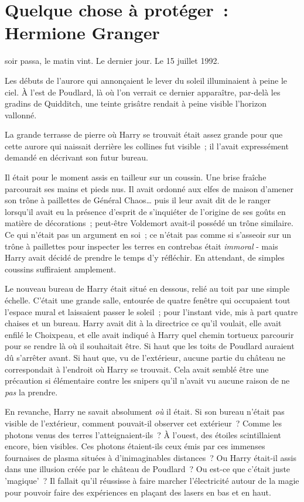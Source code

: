 \chapter{Quelque chose à protéger~: Hermione Granger}

 soir passa, le matin vint. Le dernier jour. Le 15 juillet 1992.

\hplettrineextrapara
Les débuts de l'aurore qui annonçaient le lever du soleil illuminaient à peine le ciel. À l'est de Poudlard, là où l'on verrait ce dernier apparaître, par-delà les gradins de Quidditch, une teinte grisâtre rendait à peine visible l'horizon vallonné.

La grande terrasse de pierre où Harry se trouvait était assez grande pour que cette aurore qui naissait derrière les collines fut visible~; il l'avait expressément demandé en décrivant son futur bureau.

Il était pour le moment assis en tailleur sur un coussin. Une brise fraîche parcourait ses mains et pieds nus. Il avait ordonné aux elfes de maison d'amener son trône à paillettes de Général Chaos… puis il leur avait dit de le ranger lorsqu'il avait eu la présence d'esprit de s'inquiéter de l'origine de ses goûts en matière de décorations~; peut-être Voldemort avait-il possédé un trône similaire. Ce qui n'était pas un argument en soi~; ce n'était pas comme si s'asseoir sur un trône à paillettes pour inspecter les terres en contrebas était \emph{immoral} - mais Harry avait décidé de prendre le temps d'y réfléchir. En attendant, de simples coussins suffiraient amplement.

Le nouveau bureau de Harry était situé en dessous, relié au toit par une simple échelle. C'était une grande salle, entourée de quatre fenêtre qui occupaient tout l'espace mural et laissaient passer le soleil~; pour l'instant vide, mis à part quatre chaises et un bureau. Harry avait dit à la directrice ce qu'il voulait, elle avait enfilé le Choixpeau, et elle avait indiqué à Harry quel chemin tortueux parcourir pour se rendre là où il souhaitait être. Si haut que les toits de Poudlard auraient dû s'arrêter avant. Si haut que, vu de l'extérieur, aucune partie du château ne correspondait à l'endroit où Harry se trouvait. Cela avait semblé être une précaution si élémentaire contre les snipers qu'il n'avait vu aucune raison de ne \emph{pas} la prendre.

En revanche, Harry ne savait absolument \emph{où} il était. Si son bureau n'était pas visible de l'extérieur, comment pouvait-il observer cet extérieur~? Comme les photons venus des terres l'atteignaient-ils~? À l'ouest, des étoiles scintillaient encore, bien visibles. Ces photons étaient-ils ceux émis par ces immenses fournaises de plasma situées à d'inimaginables distances~? Ou Harry était-il assis dans une illusion créée par le château de Poudlard~? Ou est-ce que c'était juste 'magique'~? Il fallait qu'il réussisse à faire marcher l'électricité autour de la magie pour pouvoir faire des expériences en plaçant des lasers en bas et en haut.

